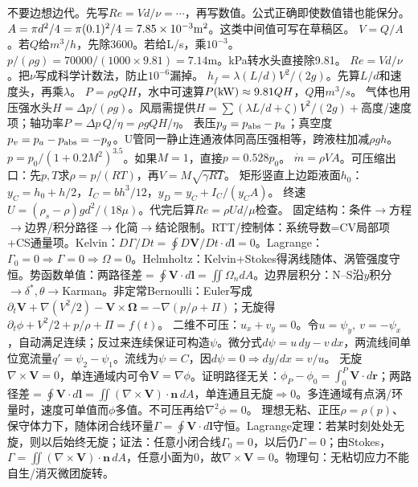 不要边想边代。先写$Re=Vd/\nu=\cdots$，再写数值。公式正确即使数值错也能保分。
$A=\pi d^2/4=\pi(0.1)^2/4=7.85\times10^{-3}{\rm m^2}$。这类中间值可写在草稿区。
$V=Q/A$。若$Q$给$m^3/h$，先除3600。若给L/s，乘$10^{-3}$。
$p/(\rho g)=70000/(1000\times9.81)=7.14$m。kPa转水头直接除9.81。
$Re=Vd/\nu$。把$\nu$写成科学计数法，防止$10^{-6}$漏掉。
$h_f=\lambda(L/d)V^2/(2g)$。先算$L/d$和速度头，再乘$\lambda$。
$P=\rho gQH$，水中可速算$P({\rm kW})\approx9.81QH$，$Q$用$m^3/s$。
气体也用压强水头$H=\Delta p/(\rho g)$。风扇需提供$H=\sum(\lambda L/d+\zeta)V^2/(2g)+$高度/速度项；轴功率$P=\Delta p\,Q/\eta=\rho gQH/\eta$。
表压$p_g=p_{\rm abs}-p_a$；真空度$p_v=p_a-p_{\rm abs}=-p_g$。U管同一静止连通液体同高压强相等，跨液柱加减$\rho gh$。
$p=p_0/(1+0.2M^2)^{3.5}$。如果$M=1$，直接$p=0.528p_0$。
$\dot m=\rho VA$。可压缩出口：先$p,T$求$\rho=p/(RT)$，再$V=M\sqrt{\gamma RT}$。
矩形竖直上边距液面$h_0$：$y_C=h_0+h/2$，$I_C=bh^3/12$，$y_D=y_C+I_C/(y_CA)$。
终速$U=(\rho_s-\rho)gd^2/(18\mu)$。代完后算$Re=\rho Ud/\mu$检查。
固定结构：条件$\to$方程$\to$边界/积分路径$\to$化简$\to$结论限制。RTT/控制体：系统导数=CV局部项+CS通量项。Kelvin：$D\Gamma/Dt=\oint D\bm V/Dt\cdot d\bm l=0$。Lagrange：$\Gamma_0=0\Rightarrow\Gamma=0\Rightarrow\Omega=0$。Helmholtz：Kelvin+Stokes得涡线随体、涡管强度守恒。势函数单值：两路径差$=\oint\bm V\cdot d\bm l=\iint\Omega_n dA$。边界层积分：N--S沿$y$积分$\to\delta^*,\theta\to$Karman。非定常Bernoulli：Euler写成$\partial_t\bm V+\nabla(V^2/2)-\bm V\times\bm\Omega=-\nabla(p/\rho+\Pi)$；无旋得$\partial_t\phi+V^2/2+p/\rho+\Pi=f(t)$。
二维不可压：$u_x+v_y=0$。令$u=\psi_y,\ v=-\psi_x$，自动满足连续；反过来连续保证可构造$\psi$。微分式$d\psi=u\,dy-v\,dx$，两流线间单位宽流量$q'=\psi_2-\psi_1$。流线为$\psi=C$，因$d\psi=0\Rightarrow dy/dx=v/u$。
无旋$\nabla\times\bm V=0$，单连通域内可令$\bm V=\nabla\phi$。证明路径无关：$\phi_P-\phi_0=\int_0^P\bm V\cdot d\bm r$；两路径差$=\oint\bm V\cdot d\bm l=\iint(\nabla\times\bm V)\cdot\bm n\,dA$，单连通且无旋$\Rightarrow0$。多连通域有点涡/环量时，速度可单值而$\phi$多值。不可压再给$\nabla^2\phi=0$。
理想无粘、正压$\rho=\rho(p)$、保守体力下，随体闭合线环量$\Gamma=\oint\bm V\cdot d\bm l$守恒。Lagrange定理：若某时刻处处无旋，则以后始终无旋；证法：任意小闭合线$\Gamma_0=0$，以后仍$\Gamma=0$；由Stokes，$\Gamma=\iint(\nabla\times\bm V)\cdot\bm n\,dA$，任意小面为0，故$\nabla\times\bm V=0$。物理句：无粘切应力不能自生/消灭微团旋转。
